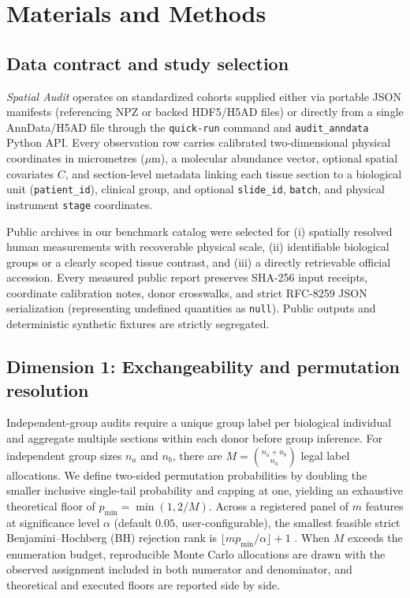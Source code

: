 \documentclass[11pt]{article}
\begin{document}
\FloatBarrier

\section{Materials and Methods}
\subsection{Data contract and study selection}
\textit{Spatial Audit} operates on standardized cohorts supplied either via portable JSON manifests (referencing NPZ or backed HDF5/H5AD files) or directly from a single AnnData/H5AD file through the \texttt{quick-run} command and \texttt{audit\_anndata} Python API. Every observation row carries calibrated two-dimensional physical coordinates in micrometres ($\mu\mathrm{m}$), a molecular abundance vector, optional spatial covariates $C$, and section-level metadata linking each tissue section to a biological unit (\texttt{patient\_id}), clinical group, and optional \texttt{slide\_id}, \texttt{batch}, and physical instrument \texttt{stage} coordinates.

Public archives in our benchmark catalog were selected for (i) spatially resolved human measurements with recoverable physical scale, (ii) identifiable biological groups or a clearly scoped tissue contrast, and (iii) a directly retrievable official accession. Every measured public report preserves SHA-256 input receipts, coordinate calibration notes, donor crosswalks, and strict RFC-8259 JSON serialization (representing undefined quantities as \texttt{null}). Public outputs and deterministic synthetic fixtures are strictly segregated.

\subsection{Dimension 1: Exchangeability and permutation resolution}
Independent-group audits require a unique group label per biological individual and aggregate multiple sections within each donor before group inference. For independent group sizes $n_a$ and $n_b$, there are $M = \binom{n_a + n_b}{n_a}$ legal label allocations. We define two-sided permutation probabilities by doubling the smaller inclusive single-tail probability and capping at one, yielding an exhaustive theoretical floor of $p_{\min} = \min(1, 2/M)$. Across a registered panel of $m$ features at significance level $\alpha$ (default $0.05$, user-configurable), the smallest feasible strict Benjamini--Hochberg (BH) rejection rank is $\lfloor m p_{\min}/\alpha \rfloor + 1$ \cite{bh}. When $M$ exceeds the enumeration budget, reproducible Monte Carlo allocations are drawn with the observed assignment included in both numerator and denominator, and theoretical and executed floors are reported side by side.
\end{document}
